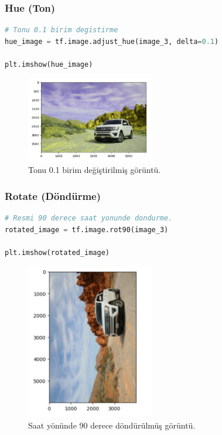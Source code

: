 \subsubsection{Hue (Ton)}

\begin{lstlisting}[language=Python]
# Tonu 0.1 birim degistirme
hue_image = tf.image.adjust_hue(image_3, delta=0.1)

plt.imshow(hue_image)
\end{lstlisting}

\begin{figure}[h]
    \centering
    \includegraphics[width=0.5\textwidth]{images/image_aug_09.png}
    \caption{Tonu 0.1 birim değiştirilmiş görüntü.}
    \label{fig:enter-label}
\end{figure}

\subsubsection{Rotate (Döndürme)}

\begin{lstlisting}[language=Python]
# Resmi 90 derece saat yonunde dondurme.
rotated_image = tf.image.rot90(image_3)

plt.imshow(rotated_image)
\end{lstlisting}

\newpage

\begin{figure}[h]
    \centering
    \includegraphics[width=0.5\textwidth]{images/image_aug_10.png}
    \caption{Saat yönünde 90 derece döndürülmüş görüntü.}
    \label{fig:enter-label}
\end{figure}

